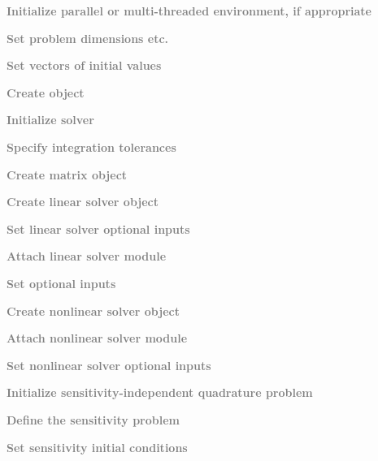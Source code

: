 \begin{Steps}
  
\item 
  \textcolor{gray}{\bf Initialize parallel or multi-threaded environment,
  if appropriate}

\item
  \textcolor{gray}{\bf Set problem dimensions etc.}
  
\item
  \textcolor{gray}{\bf Set vectors of initial values}
 
\item
  \textcolor{gray}{\bf Create {\cvodes} object}

\item
  \textcolor{gray}{\bf Initialize {\cvodes} solver}

\item
  \textcolor{gray}{\bf Specify integration tolerances}

\item
  \textcolor{gray}{\bf Create matrix object}

\item
  \textcolor{gray}{\bf Create linear solver object}

\item
  \textcolor{gray}{\bf Set linear solver optional inputs}

\item
  \textcolor{gray}{\bf Attach linear solver module}

\item
  \textcolor{gray}{\bf Set optional inputs}

\item
  \textcolor{gray}{\bf Create nonlinear solver object}

\item
  \textcolor{gray}{\bf Attach nonlinear solver module}

\item
  \textcolor{gray}{\bf Set nonlinear solver optional inputs}

\item
  \textcolor{gray}{\bf Initialize sensitivity-independent quadrature problem}

\item\label{i:quad_sens_sens_def}
  \textcolor{gray}{\bf Define the sensitivity problem}

\item
  \textcolor{gray}{\bf Set sensitivity initial conditions}


\end{Steps}

